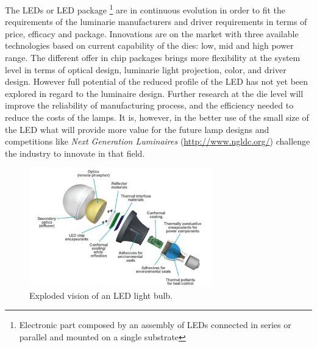 %

The LEDs or LED package \footnote{Electronic part composed by an assembly of LEDs connected in series or parallel and mounted on a single substrate} are in continuous evolution in order to fit the requirements of the luminarie manufacturers and driver requirements in terms of price, efficacy and package. Innovations are on the market with three available technologies based on current capability of the dies: low, mid and high power range. The different offer in chip packages brings more flexibility at the system level in terms of optical design, luminarie light projection, color, and driver design. However full potential of the reduced profile of the LED has not yet been explored in regard to the luminaire design. Further research at the die level will improve the reliability of manufacturing process, and the efficiency needed to reduce the costs of the lamps. It is, however, in the better use of the small size of the LED what will provide more value for the future lamp designs and competitions like \emph{Next Generation Luminaires} (\url{http://www.ngldc.org/}) challenge the industry to innovate in that field.

\begin{figure}[!h]
    \centering
    \includegraphics[width=8cm]{./0_intro/img/exploded_bulb_2.jpg}
    \caption{Exploded vision of an LED light bulb.}
    \label{fig:exploded_bulb}
\end{figure}



